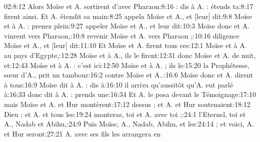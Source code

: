 \begin{multicols}{3}
{02:8:12	Alors Moïse et A. sortirent d'avec Pharaon:8:16	: dis à A. : étends ta:8:17	firent ainsi. Et A. étendit sa main:8:25	appela Moïse et A., et [leur] dit:9:8	Moïse et à A. : prenez plein:9:27	appeler Moïse et A., et leur dit:10:3	Moïse donc et A. vinrent vers Pharaon,:10:8	revenir Moïse et A. vers Pharaon ;:10:16	diligence Moïse et A., et [leur] dit:11:10	Et Moïse et A. firent tous ces:12:1	Moïse et à A. au pays d'Egypte,:12:28	Moïse et à A., ils le firent:12:31	donc Moïse et A. de nuit, et:12:43	Moïse et à A. : c'est ici:12:50	Moïse et à A. ; ils le:15:20	la Prophétesse, sœur d'A., prit un tambour:16:2	contre Moïse et A..:16:6	Moïse donc et A. dirent à tous:16:9	Moïse dit à A. : dis à:16:10	il arriva qu'aussitôt qu'A. eut parlé à:16:33	donc dit à A. : prends une:16:34	Et A. le posa devant le Témoignage:17:10	mais Moïse et A. et Hur montèrent:17:12	dessus ; et A. et Hur soutenaient:18:12	Dieu ; et A. et tous les:19:24	monteras, toi et A. avec toi ;:24:1	l'Eternel, toi et A., Nadab et Abihu,:24:9	Puis Moïse, A., Nadab, Abihu, et les:24:14	; et voici, A. et Hur seront:27:21	A. avec ses fils les arrangera en\newline
}
\end{multicols}
